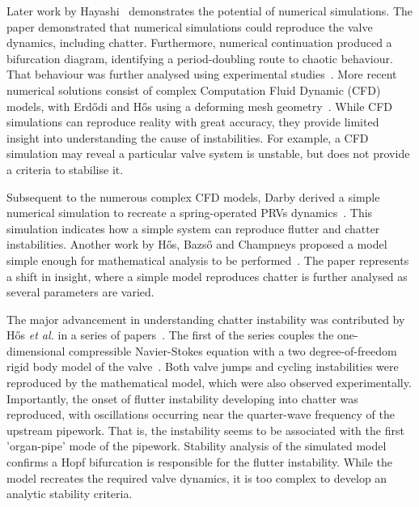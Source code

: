 Later work by Hayashi~\cite{Hayashi1995InstabilityCircuit} demonstrates the potential of numerical simulations. The paper demonstrated that numerical simulations could reproduce the valve dynamics, including chatter. Furthermore, numerical continuation produced a bifurcation diagram, identifying a period-doubling route to chaotic behaviour. That behaviour was further analysed using experimental studies~\cite{Bazso2013AnValve}. More recent numerical solutions consist of complex Computation Fluid Dynamic (CFD) models, with Erd\H{o}di and H\H{o}s using a deforming mesh geometry~\cite{Erdodi2017PredictionModelling}. While CFD simulations can reproduce reality with great accuracy, they provide limited insight into understanding the cause of instabilities. For example, a CFD simulation may reveal a particular valve system is unstable, but does not provide a criteria to stabilise it.

Subsequent to the numerous complex CFD models, Darby derived a simple numerical simulation to recreate a spring-operated PRVs dynamics~\cite{Darby2013TheModel}. This simulation indicates how a simple system can reproduce flutter and chatter instabilities. Another work by H\H{o}s, Bazs\H{o} and Champneys proposed a model simple enough for mathematical analysis to be performed~\cite{Hos2015ModelPipe}. The paper represents a shift in insight, where a simple model reproduces chatter is further analysed as several parameters are varied.


The major advancement in understanding chatter instability was contributed by H\H{o}s \emph{et al.}
in a series of papers~\cite{Hos2014DynamicMechanisms,Hos2015DynamicModelling,Hos2016DynamicService,Hos2017DynamicRecommendations}. The first of the series couples the one-dimensional compressible Navier-Stokes equation with a two degree-of-freedom rigid body model of the valve~\cite{Hos2014DynamicMechanisms}.
Both valve jumps and cycling instabilities were reproduced by the mathematical model, which were also observed experimentally. Importantly, the onset of flutter instability developing into chatter was reproduced, with oscillations occurring near the quarter-wave frequency of the upstream pipework. That is, the instability seems to be associated with the first 'organ-pipe' mode of the pipework. Stability analysis of the simulated model confirms a Hopf bifurcation is responsible for the flutter instability. While the model recreates the required valve dynamics, it is too complex to develop an analytic stability criteria. %

